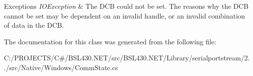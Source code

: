\begin{DoxyExceptions}{Exceptions}
{\em I\+O\+Exception} & The D\+CB could not be set. The reasons why the D\+CB cannot be set may be dependent on an invalid handle, or an invalid combination of data in the D\+CB.\\
\hline
\end{DoxyExceptions}


The documentation for this class was generated from the following file\+:\begin{DoxyCompactItemize}
\item 
C\+:/\+P\+R\+O\+J\+E\+C\+T\+S/\+C\#/\+B\+S\+L430.\+N\+E\+T/src/\+B\+S\+L430.\+N\+E\+T/\+Library/serialportstream/2../src/\+Native/\+Windows/Comm\+State.\+cs\end{DoxyCompactItemize}
